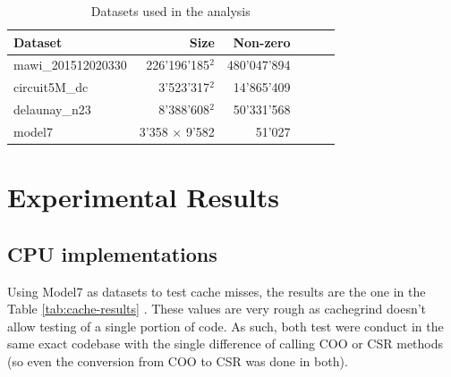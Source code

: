 \documentclass[conference]{IEEEtran}
\begin{document}
\begin{table}[]
	\centering
	\begin{adjustbox}{width=0.9\columnwidth}
		\begin{tabular}{lrrrrc}
			\toprule
			\textbf{Dataset} & \textbf{Size} & \textbf{Non-zero} \\
			\midrule
			mawi\_201512020330 & 226'196'185$^2$ & 480'047'894\\
			circuit5M\_dc & 3'523'317$^2$ & 14'865'409\\
			delaunay\_n23 & 8'388'608$^2$ & 50'331'568\\
			model7  & 3'358 $\times$ 9'582 & 51'027\\
			\bottomrule
		\end{tabular}
	\end{adjustbox}
	\vspace{1em}

	\caption{Datasets used in the analysis}
	\label{tab:dataset}
\end{table}


\clearpage
\FloatBarrier

\section{Experimental Results}

\subsection{CPU implementations}
Using Model7 as datasets to test cache misses, the results are the one in the Table \ref{tab:cache-results} . These values are very rough as cachegrind doesn't allow testing of a single portion of code. As such, both test were conduct in the same exact codebase with the single difference of calling COO or CSR methods (so even the conversion from COO to CSR was done in both).
\end{document}
